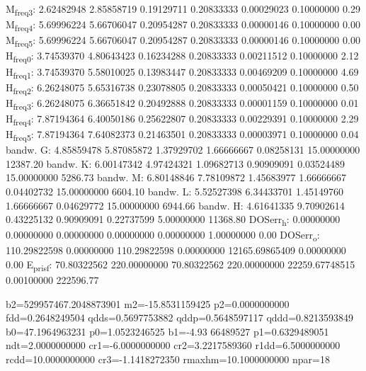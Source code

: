 \documentclass[11pt]{article}
\begin{document}
M\textsubscript{freq}\textsubscript{3}:   2.62482948   2.85858719   0.19129711   0.20833333   0.00029023   0.10000000         0.29
M\textsubscript{freq}\textsubscript{4}:   5.69996224   5.66706047   0.20954287   0.20833333   0.00000146   0.10000000         0.00
M\textsubscript{freq}\textsubscript{5}:   5.69996224   5.66706047   0.20954287   0.20833333   0.00000146   0.10000000         0.00
H\textsubscript{freq}\textsubscript{0}:   3.74539370   4.80643423   0.16234288   0.20833333   0.00211512   0.10000000         2.12
H\textsubscript{freq}\textsubscript{1}:   3.74539370   5.58010025   0.13983447   0.20833333   0.00469209   0.10000000         4.69
H\textsubscript{freq}\textsubscript{2}:   6.26248075   5.65316738   0.23078805   0.20833333   0.00050421   0.10000000         0.50
H\textsubscript{freq}\textsubscript{3}:   6.26248075   6.36651842   0.20492888   0.20833333   0.00001159   0.10000000         0.01
H\textsubscript{freq}\textsubscript{4}:   7.87194364   6.40050186   0.25622807   0.20833333   0.00229391   0.10000000         2.29
H\textsubscript{freq}\textsubscript{5}:   7.87194364   7.64082373   0.21463501   0.20833333   0.00003971   0.10000000         0.04
bandw. G:   4.85859478   5.87085872   1.37929702   1.66666667   0.08258131  15.00000000     12387.20
bandw. K:   6.00147342   4.97424321   1.09682713   0.90909091   0.03524489  15.00000000      5286.73
bandw. M:   6.80148846   7.78109872   1.45683977   1.66666667   0.04402732  15.00000000      6604.10
bandw. L:   5.52527398   6.34433701   1.45149760   1.66666667   0.04629772  15.00000000      6944.66
bandw. H:   4.61641335   9.70902614   0.43225132   0.90909091   0.22737599   5.00000000     11368.80
DOSerr\textsubscript{h}:   0.00000000   0.00000000   0.00000000   0.00000000   0.00000000   1.00000000         0.00
DOSerr\textsubscript{o}: 110.29822598   0.00000000 110.29822598   0.00000000 12165.69865409   0.00000000         0.00
E\textsubscript{pris}\textsubscript{f}:  70.80322562 220.00000000  70.80322562 220.00000000 22259.67748515   0.00100000    222596.77

  b2=529957467.2048873901 m2=-15.8531159425 p2=0.0000000000 fdd=0.2648249504 qdds=0.5697753882 qddp=0.5648597117 qddd=0.8213593849 b0=47.1964963231 p0=1.0523246525 b1=-4.93
66489527 p1=0.6329489051 ndt=2.0000000000 cr1=-6.0000000000 cr2=3.2217589360 r1dd=6.5000000000 rcdd=10.0000000000 cr3=-1.1418272350 rmaxhm=10.1000000000 npar=18 
\end{document}

